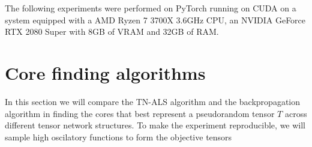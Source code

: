 \documentclass[11pt,a4paper,openright,oneside]{book}
\numberwithin{equation}{section}
\begin{document}
{The following experiments were performed on PyTorch running on CUDA on a system
equipped with a AMD Ryzen 7 3700X 3.6GHz CPU, an NVIDIA GeForce RTX 2080 Super with 8GB of VRAM and
32GB of RAM.

\section{Core finding algorithms} \label{core-finding-algorithms}
In this section we will compare the TN-ALS algorithm and the backpropagation algorithm in finding the cores that
best represent a pseudorandom tensor $T$ across different tensor network structures. To make the experiment reproducible,
we will sample high oscilatory functions to form the objective tensors

\begin{figure}[H]


\end{figure}}
\end{document}
